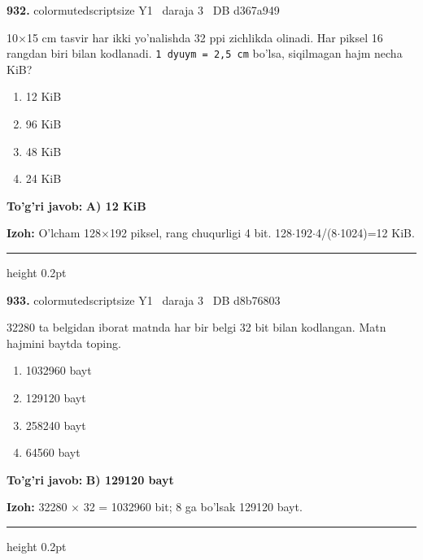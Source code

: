 \documentclass[10pt,a4paper,oneside]{article}
\begin{document}
\noindent\textbf{\color{ink}932.}  {color{muted}scriptsize Y1 \textbullet\ daraja 3 \textbullet\ DB d367a949}
\par
10\ensuremath{\times}15 cm tasvir har ikki yo'nalishda 32 ppi zichlikda olinadi. Har piksel 16 rangdan biri bilan kodlanadi. \texttt{1 dyuym = 2,5 cm} bo'lsa, siqilmagan hajm necha KiB?
\begin{enumerate}[label=\Alph*),leftmargin=9mm]
\item 12 KiB
\item 96 KiB
\item 48 KiB
\item 24 KiB
\end{enumerate}
\begin{tcolorbox}[enhanced,breakable,colback=teal!4,colframe=teal!50!black,boxrule=0.5pt,arc=1.1mm,left=3mm,right=3mm,top=1.7mm,bottom=1.7mm,before skip=2mm,after skip=2mm]
\textbf{\color{teal}To'g'ri javob:} \textbf{A) 12 KiB}
\par\smallskip
\textbf{Izoh:} O'lcham 128\ensuremath{\times}192 piksel, rang chuqurligi 4 bit. 128\ensuremath{\cdot}192\ensuremath{\cdot}4/(8\ensuremath{\cdot}1024)=12 KiB.
\end{tcolorbox}
\vspace{2mm}\hrule height 0.2pt \vspace{3mm}

\noindent\textbf{\color{ink}933.}  {color{muted}scriptsize Y1 \textbullet\ daraja 3 \textbullet\ DB d8b76803}
\par
32280 ta belgidan iborat matnda har bir belgi 32 bit bilan kodlangan. Matn hajmini baytda toping.
\begin{enumerate}[label=\Alph*),leftmargin=9mm]
\item 1032960 bayt
\item 129120 bayt
\item 258240 bayt
\item 64560 bayt
\end{enumerate}
\begin{tcolorbox}[enhanced,breakable,colback=teal!4,colframe=teal!50!black,boxrule=0.5pt,arc=1.1mm,left=3mm,right=3mm,top=1.7mm,bottom=1.7mm,before skip=2mm,after skip=2mm]
\textbf{\color{teal}To'g'ri javob:} \textbf{B) 129120 bayt}
\par\smallskip
\textbf{Izoh:} 32280 \ensuremath{\times} 32 = 1032960 bit; 8 ga bo'lsak 129120 bayt.
\end{tcolorbox}
\vspace{2mm}\hrule height 0.2pt \vspace{3mm}
\end{document}
